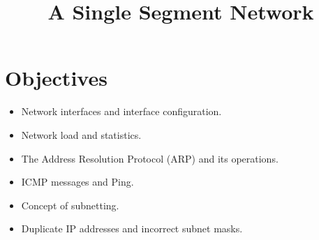 \documentclass{../UTNetLab}
\title{A Single Segment Network}
\begin{document}
\section*{Objectives}
\begin{itemize}
    \item Network interfaces and interface configuration.
    \item Network load and statistics.
    \item The Address Resolution Protocol (ARP) and its operations.
    \item ICMP messages and Ping.
    \item Concept of subnetting.
    \item Duplicate IP addresses and incorrect subnet masks.
\end{itemize}
\end{document}
